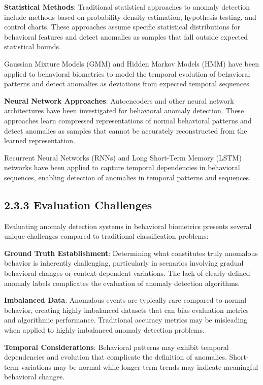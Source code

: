\documentclass[
  12pt,
  a4paper,
]{report}
\begin{document}
\textbf{Statistical Methods}: Traditional statistical approaches to
anomaly detection include methods based on probability density
estimation, hypothesis testing, and control charts. These approaches
assume specific statistical distributions for behavioral features and
detect anomalies as samples that fall outside expected statistical
bounds.

Gaussian Mixture Models (GMM) and Hidden Markov Models (HMM) have been
applied to behavioral biometrics to model the temporal evolution of
behavioral patterns and detect anomalies as deviations from expected
temporal sequences.

\textbf{Neural Network Approaches}: Autoencoders and other neural
network architectures have been investigated for behavioral anomaly
detection. These approaches learn compressed representations of normal
behavioral patterns and detect anomalies as samples that cannot be
accurately reconstructed from the learned representation.

Recurrent Neural Networks (RNNs) and Long Short-Term Memory (LSTM)
networks have been applied to capture temporal dependencies in
behavioral sequences, enabling detection of anomalies in temporal
patterns and sequences.

\subsection{2.3.3 Evaluation Challenges}\label{evaluation-challenges}

Evaluating anomaly detection systems in behavioral biometrics presents
several unique challenges compared to traditional classification
problems:

\textbf{Ground Truth Establishment}: Determining what constitutes truly
anomalous behavior is inherently challenging, particularly in scenarios
involving gradual behavioral changes or context-dependent variations.
The lack of clearly defined anomaly labels complicates the evaluation of
anomaly detection algorithms.

\textbf{Imbalanced Data}: Anomalous events are typically rare compared
to normal behavior, creating highly imbalanced datasets that can bias
evaluation metrics and algorithmic performance. Traditional accuracy
metrics may be misleading when applied to highly imbalanced anomaly
detection problems.

\textbf{Temporal Considerations}: Behavioral patterns may exhibit
temporal dependencies and evolution that complicate the definition of
anomalies. Short-term variations may be normal while longer-term trends
may indicate meaningful behavioral changes.
\end{document}
